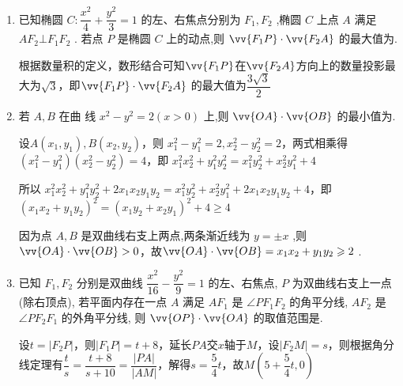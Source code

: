 \begin{enumerate}
\begin{jieda}
        设$C(x, y)$，则$G\left(\dfrac{x}{3}, \dfrac{y}{3}\right)$，因为$\vv{GM}//\vv{AB}$，所以$M\left(0, \dfrac{y}{3}\right)$，因此$\sqrt{x^2 + \dfrac{4y^2}{9}} = \sqrt{1+\dfrac{y^2}{9}}$，即$x^2+\dfrac{y^2}{3} = 1$，当$y = 0$时$\triangle ABC$不存在，故 $C$ 的轨迹方程为$x^2+\dfrac{y^2}{3} = 1 (y \neq 0)$
    \end{jieda}
    \item 已知椭圆 $C : \dfrac{{x}^{2}}{4} + \dfrac{{y}^{2}}{3} = 1$ 的左、右焦点分别为 ${F}_{1},{F}_{2}$ ,椭圆 $C$ 上点 $A$ 满足 $A{F}_{2} \bot  {F}_{1}{F}_{2}$ . 若点 $P$ 是椭圆 $C$ 上的动点,则 $\vv{{F}_{1}P} \cdot  \vv{{F}_{2}A}$ 的最大值为.
    \begin{jieda}
        根据数量积的定义，数形结合可知$\vv{F_1P}$在$\vv{F_2A}$方向上的数量投影最大为$\sqrt{3}$，即$\vv{{F}_{1}P} \cdot  \vv{{F}_{2}A}$ 的最大值为$\dfrac{3\sqrt{3}}{2}$
    \end{jieda}
    \item 若 $A,B$ 在曲 线 ${x}^{2} - {y}^{2} = 2\left( {x > 0}\right)$ 上,则 $\vv{OA} \cdot  \vv{OB}$ 的最小值为.
    \begin{jieda}
        设$A(x_1, y_1), B(x_2, y_2)$，则 ${x}_{1}^{2} - {y}_{1}^{2} = 2,{x}_{2}^{2} - {y}_{2}^{2} = 2$，两式相乘得 $\left( {{x}_{1}^{2} - {y}_{1}^{2}}\right) \left( {{x}_{2}^{2} - {y}_{2}^{2}}\right)  = 4$，即 ${x}_{1}^{2}{x}_{2}^{2} + {y}_{1}^{2}{y}_{2}^{2} = {x}_{1}^{2}{y}_{2}^{2} + {x}_{2}^{2}{y}_{1}^{2} + 4$
        
        所以 ${x}_{1}^{2}{x}_{2}^{2} + {y}_{1}^{2}{y}_{2}^{2} + 2{x}_{1}{x}_{2}{y}_{1}{y}_{2} = {x}_{1}^{2}{y}_{2}^{2} + {x}_{2}^{2}{y}_{1}^{2} + 2{x}_{1}{x}_{2}{y}_{1}{y}_{2} + 4$，即 ${\left( {x}_{1}{x}_{2} + {y}_{1}{y}_{2}\right) }^{2} = {\left( {x}_{1}{y}_{2} + {x}_{2}{y}_{1}\right) }^{2} + 4 \geq  4$
        
        因为点 $A,B$ 是双曲线右支上两点,两条渐近线为 $y =  \pm  x$ ,则 $\vv{OA} \cdot  \vv{OB} > 0$，故$\vv{OA} \cdot  \vv{OB} = {x}_{1}{x}_{2} + {y}_{1}{y}_{2} \geq  2$ .
    \end{jieda}

    \item 已知 ${F}_{1},{F}_{2}$ 分别是双曲线 $\dfrac{{x}^{2}}{16} - \dfrac{{y}^{2}}{9} = 1$ 的左、右焦点, $P$ 为双曲线右支上一点 (除右顶点), 若平面内存在一点 $A$ 满足 $A{F}_{1}$ 是 $\angle P{F}_{1}{F}_{2}$ 的角平分线, $A{F}_{2}$ 是 $\angle P{F}_{2}{F}_{1}$ 的外角平分线, 则 $\vv{OP} \cdot  \vv{OA}$ 的取值范围是.
    \begin{jieda}
        设$t = |F_2P|$，则$|F_1P| = t + 8$，延长$PA$交$x$轴于$M$，设$|F_2M| = s$，则根据角分线定理有$\dfrac{t}{s} = \dfrac{t+8}{s+10} = \dfrac{|PA|}{|AM|}$，解得$s = \dfrac{5}{4}t$，故$M\left(5+\dfrac{5}{4}t, 0\right)$


\end{jieda}
\end{enumerate}
